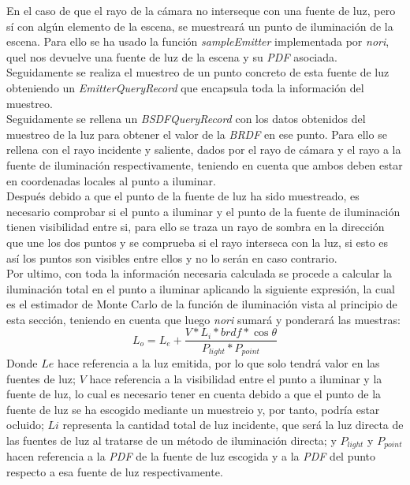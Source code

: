 \documentclass[10pt,oneside,a4paper]{article}
\begin{document}
En el caso de que el rayo de la cámara no interseque con una fuente de luz, pero sí con algún elemento de la escena, se muestreará un punto de iluminación de la escena. Para ello se ha usado la función \textit{sampleEmitter} implementada por \textit{nori}, quel nos devuelve una fuente de luz de la escena y su \textit{PDF} asociada. Seguidamente se realiza el muestreo de un punto concreto de esta fuente de luz obteniendo un \textit{EmitterQueryRecord} que encapsula toda la información del muestreo.\\

Seguidamente se rellena un \textit{BSDFQueryRecord} con los datos obtenidos del muestreo de la luz para obtener el valor de la \textit{BRDF} en ese punto. Para ello se rellena con el rayo incidente y saliente, dados por el rayo de cámara y el rayo a la fuente de iluminación respectivamente, teniendo en cuenta que ambos deben estar en coordenadas locales al punto a iluminar.\\

Después debido a que el punto de la fuente de luz ha sido muestreado, es necesario comprobar si el punto a iluminar y el punto de la fuente de iluminación tienen visibilidad entre si, para ello se traza un rayo de sombra en la dirección que une los dos puntos y se comprueba si el rayo interseca con la luz, si esto es así los puntos son visibles entre ellos y no lo serán en caso contrario.\\

Por ultimo, con toda la información necesaria calculada se procede a calcular la iluminación total en el punto a iluminar aplicando la siguiente expresión, la cual es el estimador de Monte Carlo de la función de iluminación vista al principio de esta sección, teniendo en cuenta que luego \textit{nori} sumará y ponderará las muestras:
 $$L_o = L_e  + \frac{ V * L_i * brdf * \cos{\theta}}{P_{light} * P_{point}}$$ 
Donde $Le$ hace referencia a la luz emitida, por lo que solo tendrá valor en las fuentes de luz; $V$ hace referencia a la visibilidad entre el punto a iluminar y la fuente de luz, lo cual es necesario tener en cuenta debido a que el punto de la fuente de luz se ha escogido mediante un muestreio y, por tanto, podría estar ocluido; $Li$ representa la cantidad total de luz incidente, que será la luz directa de las fuentes de luz al tratarse de un método de iluminación directa; y $P_{light}$ y $P_{point}$ hacen referencia a la \textit{PDF} de la fuente de luz escogida y a la \textit{PDF} del punto respecto a esa fuente de luz respectivamente.
\end{document}
